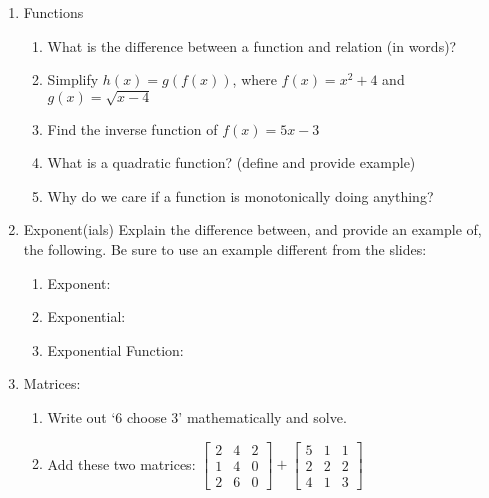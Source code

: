 \documentclass[12pt,thmsa]{article}
\begin{document}
\begin{enumerate}
    \item Functions
        \begin{enumerate}
            \item What is the difference between a function and relation (in words)?
            \item Simplify $h(x)=g(f(x))$, where $f(x)=x^2+4$ and $g(x)=\sqrt{x-4}$ %
            \item Find the inverse function of $f(x)=5x-3$ %
            \item What is a quadratic function? (define and provide example) %
            \item Why do we care if a function is monotonically doing anything?
        \end{enumerate}

    \item Exponent(ials)
        Explain the difference between, and provide an example of, the following. Be sure to use an example different from the slides: 
            \begin{enumerate}
                \item Exponent:
                \item Exponential:
                \item Exponential Function: 
            \end{enumerate}

    \item Matrices:
            \begin{enumerate}
                \item Write out `6 choose 3' mathematically and solve.
                \item Add these two matrices: $
                    \begin{bmatrix}
                        2 & 4 & 2 \\
                        1 & 4 & 0 \\
                        2 & 6 & 0
                    \end{bmatrix}
                        +
                     \begin{bmatrix}
                     5 & 1 & 1 \\
                     2 & 2 & 2\\
                     4 & 1 & 3
                     \end{bmatrix}$



\end{enumerate}
\end{enumerate}
\end{document}
